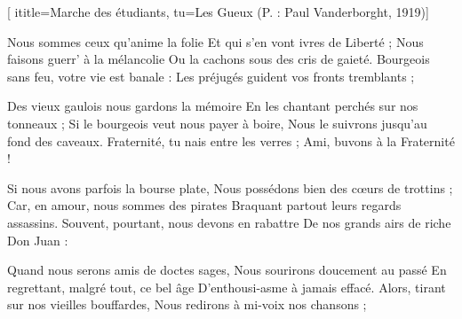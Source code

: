 [
	ititle={Marche des étudiants},
	tu={Les Gueux (P. : Paul Vanderborght, 1919)}]

  
\beginverse
Nous sommes ceux qu'anime la folie
Et qui s'en vont ivres de Liberté ;
Nous faisons guerr' à la mélancolie
Ou la cachons sous des cris de gaieté.
Bourgeois sans feu, votre vie est banale :
Les préjugés guident vos fronts tremblants ;
\endverse

\beginverse
Des vieux gaulois nous gardons la mémoire
En les chantant perchés sur nos tonneaux ;
Si le bourgeois veut nous payer à boire,
Nous le suivrons jusqu'au fond des caveaux.
Fraternité, tu nais entre les verres ;
Ami, buvons à la Fraternité !
\endverse

\beginverse
Si nous avons parfois la bourse plate,
Nous possédons bien des cœurs de trottins ;
Car, en amour, nous sommes des pirates
Braquant partout leurs regards assassins.
Souvent, pourtant, nous devons en rabattre
De nos grands airs de riche Don Juan :
\endverse

\beginverse
Quand nous serons amis de doctes sages,
Nous sourirons doucement au passé
En regrettant, malgré tout, ce bel âge
D'enthousi-asme à jamais effacé.
Alors, tirant sur nos vieilles bouffardes,
Nous redirons à mi-voix nos chansons ;
\endverse

\endsong
